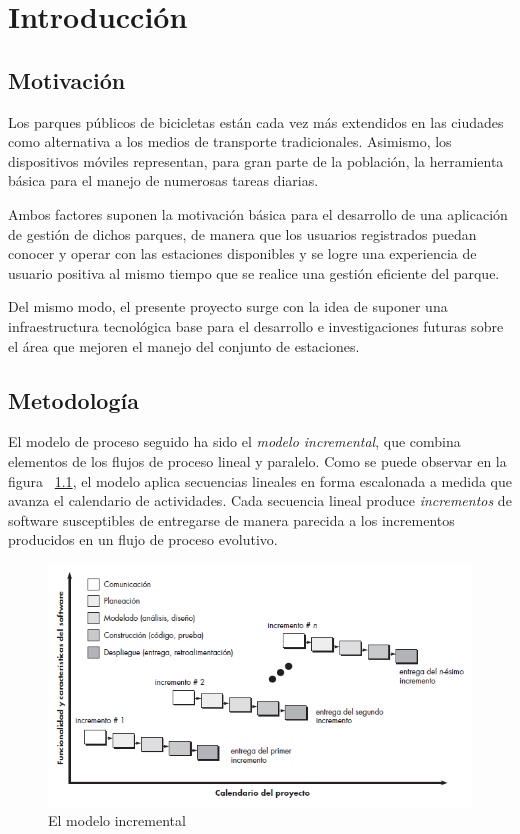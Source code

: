 \chapter{Introducción}

\section{Motivación}

Los parques públicos de bicicletas están cada vez más extendidos en las ciudades como alternativa a los medios de transporte tradicionales. Asimismo, los dispositivos móviles representan, para gran parte de la población, la herramienta básica para el manejo de numerosas tareas diarias.

Ambos factores suponen la motivación básica para el desarrollo de una aplicación de gestión de dichos parques, de manera que los usuarios registrados puedan conocer y operar con las estaciones disponibles y se logre una experiencia de usuario positiva al mismo tiempo que se realice una gestión eficiente del parque.

Del mismo modo, el presente proyecto surge con la idea de suponer una infraestructura tecnológica base para el desarrollo e investigaciones futuras sobre el área que mejoren el manejo del conjunto de estaciones.

\section{Metodología}

El modelo de proceso seguido ha sido el \emph{modelo incremental}, que combina elementos de los flujos de proceso lineal y paralelo. Como se puede observar en la figura ~\ref{fig:procesoIncremental}, el modelo aplica secuencias lineales en forma escalonada a medida que avanza el calendario de actividades. Cada secuencia lineal produce \emph{incrementos} de software susceptibles de entregarse de manera parecida a los incrementos producidos en un flujo de proceso evolutivo.

\begin{figure}
	\centering
	\includegraphics[width=\linewidth,height=\textheight,keepaspectratio]{Images/ModeloIncremental}
	\caption{El modelo incremental}
	\label{fig:procesoIncremental}
\end{figure}

